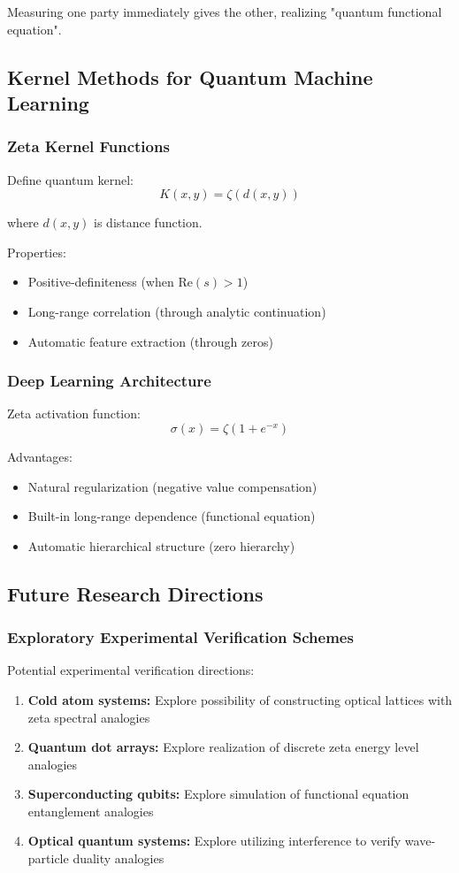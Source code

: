 \documentclass[11pt]{article}
\theoremstyle{plain}
\theoremstyle{definition}
\theoremstyle{remark}
\begin{document}
Measuring one party immediately gives the other, realizing "quantum functional equation".

\subsection{Kernel Methods for Quantum Machine Learning}

\subsubsection{Zeta Kernel Functions}

Define quantum kernel:
$$K(x,y) = \zeta(d(x,y))$$

where $d(x,y)$ is distance function.

Properties:
\begin{itemize}
\item Positive-definiteness (when $\text{Re}(s) > 1$)
\item Long-range correlation (through analytic continuation)
\item Automatic feature extraction (through zeros)
\end{itemize}

\subsubsection{Deep Learning Architecture}

Zeta activation function:
$$\sigma(x) = \zeta(1 + e^{-x})$$

Advantages:
\begin{itemize}
\item Natural regularization (negative value compensation)
\item Built-in long-range dependence (functional equation)
\item Automatic hierarchical structure (zero hierarchy)
\end{itemize}

\subsection{Future Research Directions}

\subsubsection{Exploratory Experimental Verification Schemes}

Potential experimental verification directions:
\begin{enumerate}
\item \textbf{Cold atom systems:} Explore possibility of constructing optical lattices with zeta spectral analogies
\item \textbf{Quantum dot arrays:} Explore realization of discrete zeta energy level analogies
\item \textbf{Superconducting qubits:} Explore simulation of functional equation entanglement analogies
\item \textbf{Optical quantum systems:} Explore utilizing interference to verify wave-particle duality analogies
\end{enumerate}
\end{document}
